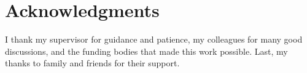 \cleardoublepage
{}
\chapter*{Acknowledgments}
I thank my supervisor for guidance and patience, my colleagues for many good discussions, and
the funding bodies that made this work possible. Last, my thanks to family and friends for
their support.
